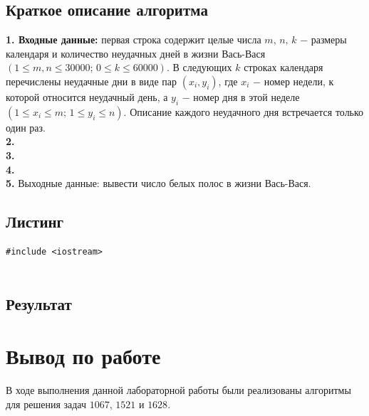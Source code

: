 \documentclass[a5paper, 10pt]{article}
\theoremstyle{definition}
\theoremstyle{plain}
\theoremstyle{remark}
\begin{document}
\subsection{Краткое описание алгоритма}
\textbf{1. Входные данные:} первая строка содержит целые числа $m, \, n, \, k$ $-$ размеры календаря и количество неудачных дней в жизни Вась-Вася $(1 \leq m, n \leq 30000; \, 0 \leq k \leq 60000)$. В следующих $k$ строках календаря перечислены неудачные дни в виде пар $(x_i, y_i)$, где $x_i$ $-$ номер недели, к которой относится неудачный день, а $y_i$ $-$ номер дня в этой неделе $(1 \leq x_i \leq m; \, 1 \leq y_i \leq n)$. Описание каждого неудачного дня встречается только один раз. \\
\textbf{2.}  \\
\textbf{3.}  \\
\textbf{4.}  \\
\textbf{5.} Выходные данные: вывести число белых полос в жизни Вась-Вася.
\subsection{Листинг}

\begin{center}
\begin{lstlisting}[label=some-code,caption={Исходный код для 1628}]
#include <iostream>


\end{lstlisting}
\end{center}

\subsection{Результат}



\newpage
\section{Вывод по работе}
В ходе выполнения данной лабораторной работы были реализованы алгоритмы для решения задач $1067$, $1521$ и $1628$. 
\end{document}

